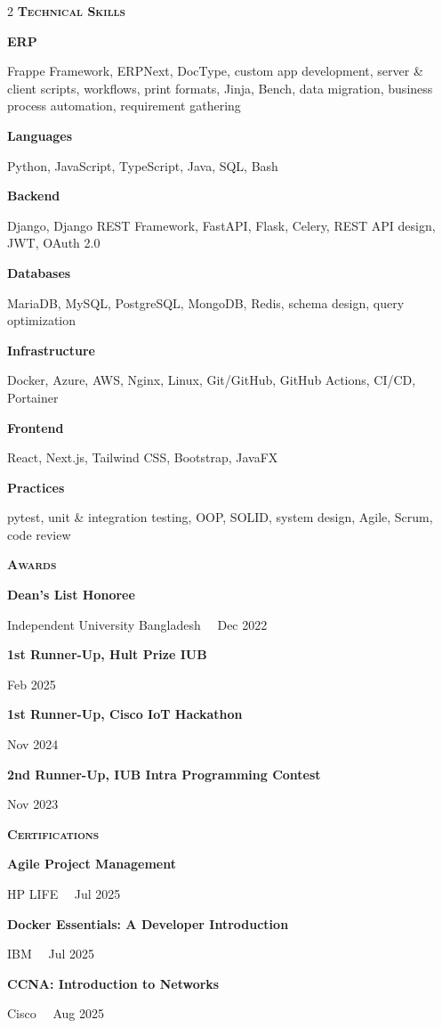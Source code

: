 \documentclass[a4paper,10pt]{article}
\newcommand{\cvsection}[1]{%
  \vspace{7pt}%
  {\color{accent}\bfseries\scshape\large #1}\par
  \vspace{1.5pt}{\color{hairline}\hrule height 0.7pt}\vspace{5pt}}
\newcommand{\skillgroup}[2]{%
  {\bfseries\small #1}\par{\small #2}\par\vspace{4pt}}
\newcommand{\award}[2]{%
  {\small\bfseries #1}\par{\footnotesize\color{soft} #2}\par\vspace{3.5pt}}
\newcommand{\dotsep}{\ \textperiodcentered\ }
\begin{document}
\begin{paracol}{2}
\cvsection{Technical Skills}
\skillgroup{ERP}{Frappe Framework, ERPNext, DocType, custom app development, server \& client scripts, workflows, print formats, Jinja, Bench, data migration, business process automation, requirement gathering}
\skillgroup{Languages}{Python, JavaScript, TypeScript, Java, SQL, Bash}
\skillgroup{Backend}{Django, Django REST Framework, FastAPI, Flask, Celery, REST API design, JWT, OAuth 2.0}
\skillgroup{Databases}{MariaDB, MySQL, PostgreSQL, MongoDB, Redis, schema design, query optimization}
\skillgroup{Infrastructure}{Docker, Azure, AWS, Nginx, Linux, Git/GitHub, GitHub Actions, CI/CD, Portainer}
\skillgroup{Frontend}{React, Next.js, Tailwind CSS, Bootstrap, JavaFX}
\skillgroup{Practices}{pytest, unit \& integration testing, OOP, SOLID, system design, Agile, Scrum, code review}

\cvsection{Awards}
\award{Dean's List Honoree}{Independent University Bangladesh \dotsep Dec 2022}
\award{1st Runner-Up, Hult Prize IUB}{Feb 2025}
\award{1st Runner-Up, Cisco IoT Hackathon}{Nov 2024}
\award{2nd Runner-Up, IUB Intra Programming Contest}{Nov 2023}

\cvsection{Certifications}
\award{Agile Project Management}{HP LIFE \dotsep Jul 2025}
\award{Docker Essentials: A Developer Introduction}{IBM \dotsep Jul 2025}
\award{CCNA: Introduction to Networks}{Cisco \dotsep Aug 2025}

\end{paracol}
\end{document}
